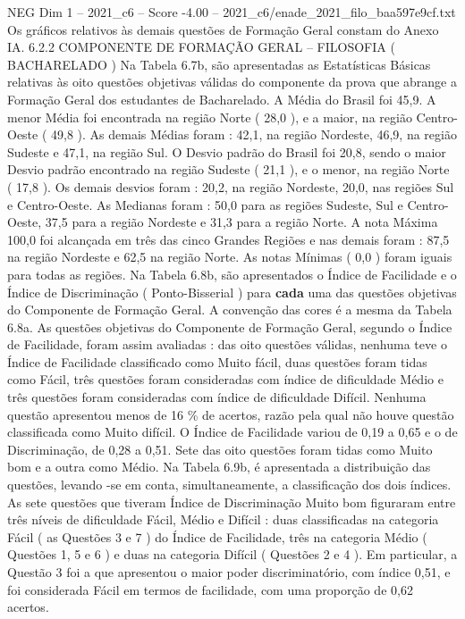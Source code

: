 \begin{textsample}{NEG Dim 1 – 2021\_c6 – Score -4.00 – 2021\_c6/enade\_2021\_filo\_baa597e9cf.txt}
Os gráficos relativos às demais questões de Formação Geral constam do Anexo IA. 6.2.2 COMPONENTE DE FORMAÇÃO GERAL – FILOSOFIA ( BACHARELADO ) Na Tabela 6.7b, são apresentadas as Estatísticas Básicas relativas às oito questões objetivas válidas do componente da prova que abrange a Formação Geral dos estudantes de Bacharelado.
A Média do Brasil foi 45,9.
A menor Média foi encontrada na região Norte ( 28,0 ), e a maior, na região Centro-Oeste ( 49,8 ).
As demais Médias foram : 42,1, na região Nordeste, 46,9, na região Sudeste e 47,1, na região Sul.
O Desvio padrão do Brasil foi 20,8, sendo o maior Desvio padrão encontrado na região Sudeste ( 21,1 ), e o menor, na região Norte ( 17,8 ).
Os demais desvios foram : 20,2, na região Nordeste, 20,0, nas regiões Sul e Centro-Oeste.
As Medianas foram : 50,0 para as regiões Sudeste, Sul e Centro-Oeste, 37,5 para a região Nordeste e 31,3 para a região Norte.
A nota Máxima 100,0 foi alcançada em três das cinco Grandes Regiões e nas demais foram : 87,5 na região Nordeste e 62,5 na região Norte.
As notas Mínimas ( 0,0 ) foram iguais para todas as regiões.
Na Tabela 6.8b, são apresentados o Índice de Facilidade e o Índice de Discriminação ( Ponto-Bisserial ) para \textbf{cada} uma das questões objetivas do Componente de Formação Geral.
A convenção das cores é a mesma da Tabela 6.8a.
As questões objetivas do Componente de Formação Geral, segundo o Índice de Facilidade, foram assim avaliadas : das oito questões válidas, nenhuma teve o Índice de Facilidade classificado como Muito fácil, duas questões foram tidas como Fácil, três questões foram consideradas com índice de dificuldade Médio e três questões foram consideradas com índice de dificuldade Difícil.
Nenhuma questão apresentou menos de 16 \% de acertos, razão pela qual não houve questão classificada como Muito difícil.
O Índice de Facilidade variou de 0,19 a 0,65 e o de Discriminação, de 0,28 a 0,51.
Sete das oito questões foram tidas como Muito bom e a outra como Médio.
Na Tabela 6.9b, é apresentada a distribuição das questões, levando -se em conta, simultaneamente, a classificação dos dois índices.
As sete questões que tiveram Índice de Discriminação Muito bom figuraram entre três níveis de dificuldade Fácil, Médio e Difícil : duas classificadas na categoria Fácil ( as Questões 3 e 7 ) do Índice de Facilidade, três na categoria Médio ( Questões 1, 5 e 6 ) e duas na categoria Difícil ( Questões 2 e 4 ).
Em particular, a Questão 3 foi a que apresentou o maior poder discriminatório, com índice 0,51, e foi considerada Fácil em termos de facilidade, com uma proporção de 0,62 acertos.

\end{textsample}
